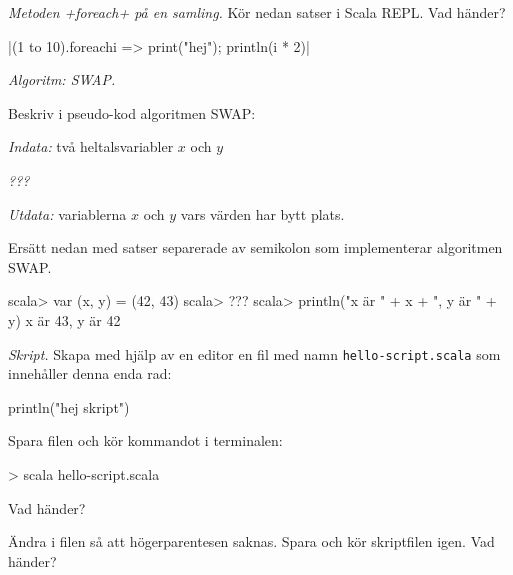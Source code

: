 \Subtask {}

\Subtask {}

\Subtask {}

\Subtask {}

\Subtask {}

\Task \emph{Metoden \code+foreach+ på en samling.} Kör nedan satser i Scala REPL. Vad händer?

\Subtask {}

\Subtask {}

\Subtask \code|(1 to 10).foreach{i => print("hej"); println(i * 2)}|

\Subtask {}

\Subtask {}


\Task \emph{Algoritm: SWAP.}

\Subtask Beskriv i pseudo-kod algoritmen SWAP: 

\emph{Indata:} två heltalsvariabler $x$ och $y$ 

\emph{???}

\emph{Utdata:} variablerna $x$ och $y$ vars värden har bytt plats.

\Subtask Ersätt  nedan med satser separerade av semikolon som implementerar algoritmen SWAP.

\begin{REPL}
scala> var (x, y) = (42, 43)
scala> ???
scala> println("x är " + x + ", y är " + y)
x är 43, y är 42
\end{REPL}



\Task \emph{Skript.} Skapa med hjälp av en editor en fil med namn \texttt{hello-script.scala} som innehåller denna enda rad:
\begin{Code}
println("hej skript")
\end{Code}
Spara filen och kör kommandot  i terminalen:
\begin{REPL}
> scala hello-script.scala
\end{REPL}

\Subtask Vad händer?

\Subtask Ändra i filen så att högerparentesen saknas. Spara och kör skriptfilen igen. Vad händer?

